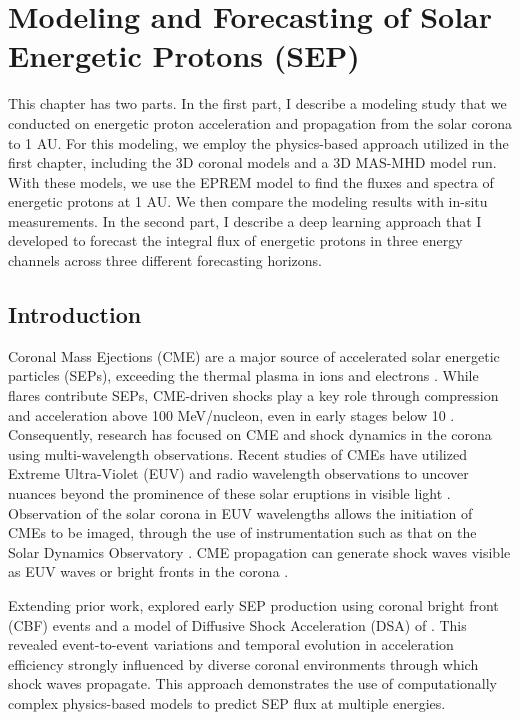 \chapter{Modeling and Forecasting of Solar Energetic Protons (SEP)}
\label{chapter4}
This chapter has two parts. In the first part, I describe a modeling study that we conducted on energetic proton acceleration and propagation from the solar corona to 1 AU. For this modeling, we employ the physics-based approach utilized in the first chapter, including the 3D coronal models and a 3D MAS-MHD model run. With these models, we use the EPREM model to find the fluxes and spectra of energetic protons at 1 AU. We then compare the modeling results with in-situ measurements. In the second part, I describe a deep learning approach that I developed to forecast the integral flux of energetic protons in three energy channels across three different forecasting horizons.

\section{Introduction}
\label{sec_ch4_intro}
Coronal Mass Ejections (CME) are a major source of accelerated solar energetic particles (SEPs), exceeding the thermal plasma in ions and electrons \citep{reames_1999}. While flares contribute SEPs, CME-driven shocks play a key role through compression and acceleration above 100 MeV/nucleon, even in early stages below 10 \rsun \citep{ontiveross_2009, gopalswamy_2011}. Consequently, research has focused on CME and shock dynamics in the corona using multi-wavelength observations. Recent studies of CMEs have utilized Extreme Ultra-Violet (EUV) and radio wavelength observations to uncover nuances beyond the prominence of these solar eruptions in visible light \citep{vourlidas_2003, zhang_2006, bein_2011}. Observation of the solar corona in EUV wavelengths allows the initiation of CMEs to be imaged, through the use of instrumentation such as that on the Solar Dynamics Observatory \citep[SDO]{lemen_2012, pesnell_2012}. CME propagation can generate shock waves visible as EUV waves or bright fronts in the corona \citep{thompson_1998, long_2011}.

Extending prior work, \citet{kozarev_2022} explored early SEP production using coronal bright front (CBF) events and a model of Diffusive Shock Acceleration (DSA) of \citet{kozarev_2016}. This revealed event-to-event variations and temporal evolution in acceleration efficiency strongly influenced by diverse coronal environments through which shock waves propagate. This approach demonstrates the use of computationally complex physics-based models to predict SEP flux at multiple energies.

